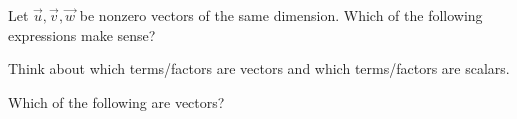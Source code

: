 \documentclass{ximera}
\begin{document}
\begin{question}
  Let $\vec{u},\vec{v},\vec{w}$ be nonzero vectors of the same dimension. Which of
  the following expressions make sense?
  \begin{selectAll}
  \end{selectAll}
  \begin{hint}
    Think about which terms/factors are vectors and which
    terms/factors are scalars.
  \end{hint}
  \begin{question}
    Which of the following are vectors?
    \begin{selectAll}
    \end{selectAll}
  \end{question}
\end{question}
\end{document}
